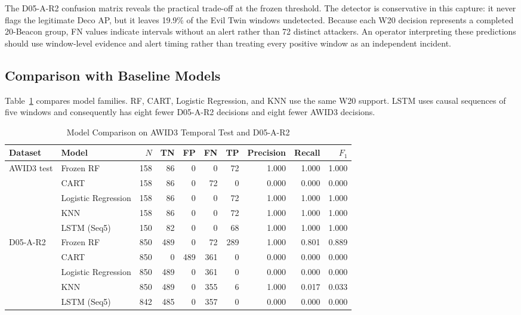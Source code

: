 \documentclass[conference]{IEEEtran}
\begin{document}
The D05-A-R2 confusion matrix reveals the practical trade-off at the frozen threshold. The detector is conservative in this capture: it never flags the legitimate Deco AP, but it leaves 19.9\% of the Evil Twin windows undetected. Because each W20 decision represents a completed 20-Beacon group, FN values indicate intervals without an alert rather than 72 distinct attackers. An operator interpreting these predictions should use window-level evidence and alert timing rather than treating every positive window as an independent incident.

\subsection{Comparison with Baseline Models}

Table~\ref{tab:baselines} compares model families. RF, CART, Logistic Regression, and KNN use the same W20 support. LSTM uses causal sequences of five windows and consequently has eight fewer D05-A-R2 decisions and eight fewer AWID3 decisions.

\begin{table}[t]
\caption{Model Comparison on AWID3 Temporal Test and D05-A-R2}
\label{tab:baselines}
\centering
\footnotesize
\begin{tabular}{@{}llrrrrrrrr@{}}
\toprule
\textbf{Dataset} & \textbf{Model} & \textbf{$N$} & \textbf{TN} & \textbf{FP} & \textbf{FN} & \textbf{TP} & \textbf{Precision} & \textbf{Recall} & \textbf{$F_1$}\\
\midrule
\multirow{5}{*}{AWID3 test}
 & Frozen RF & 158 & 86 & 0 & 0 & 72 & 1.000 & 1.000 & 1.000\\
 & CART & 158 & 86 & 0 & 72 & 0 & 0.000 & 0.000 & 0.000\\
 & Logistic Regression & 158 & 86 & 0 & 0 & 72 & 1.000 & 1.000 & 1.000\\
 & KNN & 158 & 86 & 0 & 0 & 72 & 1.000 & 1.000 & 1.000\\
 & LSTM (Seq5) & 150 & 82 & 0 & 0 & 68 & 1.000 & 1.000 & 1.000\\
\midrule
\multirow{5}{*}{D05-A-R2}
 & Frozen RF & 850 & 489 & 0 & 72 & 289 & 1.000 & 0.801 & 0.889\\
 & CART & 850 & 0 & 489 & 361 & 0 & 0.000 & 0.000 & 0.000\\
 & Logistic Regression & 850 & 489 & 0 & 361 & 0 & 0.000 & 0.000 & 0.000\\
 & KNN & 850 & 489 & 0 & 355 & 6 & 1.000 & 0.017 & 0.033\\
 & LSTM (Seq5) & 842 & 485 & 0 & 357 & 0 & 0.000 & 0.000 & 0.000\\
\bottomrule
\end{tabular}
\end{table}
\end{document}
